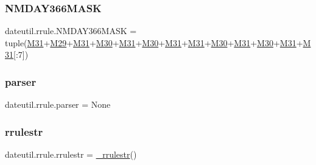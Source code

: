 \subsubsection{\texorpdfstring{N\+M\+D\+A\+Y366\+M\+A\+SK}{NMDAY366MASK}}
{\footnotesize\ttfamily dateutil.\+rrule.\+N\+M\+D\+A\+Y366\+M\+A\+SK = tuple(\hyperlink{namespacedateutil_1_1rrule_aff88a8ca05b8ccefded35b249ead0c6e}{M31}+\hyperlink{namespacedateutil_1_1rrule_aa48d0a3018e00f60591bac3321202fc6}{M29}+\hyperlink{namespacedateutil_1_1rrule_aff88a8ca05b8ccefded35b249ead0c6e}{M31}+\hyperlink{namespacedateutil_1_1rrule_a21e1626326f7f257e5d2e4a7195af9ba}{M30}+\hyperlink{namespacedateutil_1_1rrule_aff88a8ca05b8ccefded35b249ead0c6e}{M31}+\hyperlink{namespacedateutil_1_1rrule_a21e1626326f7f257e5d2e4a7195af9ba}{M30}+\hyperlink{namespacedateutil_1_1rrule_aff88a8ca05b8ccefded35b249ead0c6e}{M31}+\hyperlink{namespacedateutil_1_1rrule_aff88a8ca05b8ccefded35b249ead0c6e}{M31}+\hyperlink{namespacedateutil_1_1rrule_a21e1626326f7f257e5d2e4a7195af9ba}{M30}+\hyperlink{namespacedateutil_1_1rrule_aff88a8ca05b8ccefded35b249ead0c6e}{M31}+\hyperlink{namespacedateutil_1_1rrule_a21e1626326f7f257e5d2e4a7195af9ba}{M30}+\hyperlink{namespacedateutil_1_1rrule_aff88a8ca05b8ccefded35b249ead0c6e}{M31}+\hyperlink{namespacedateutil_1_1rrule_aff88a8ca05b8ccefded35b249ead0c6e}{M31}\mbox{[}\+:7\mbox{]})}

\mbox{\label{namespacedateutil_1_1rrule_a6fad102cafe956f4cf9b3e17c0ff78bb}} 
\subsubsection{\texorpdfstring{parser}{parser}}
{\footnotesize\ttfamily dateutil.\+rrule.\+parser = None}

\mbox{\label{namespacedateutil_1_1rrule_a833e9e6e7b3e4c65b3e740eef460d9f5}} 
\subsubsection{\texorpdfstring{rrulestr}{rrulestr}}
{\footnotesize\ttfamily dateutil.\+rrule.\+rrulestr = \hyperlink{classdateutil_1_1rrule_1_1__rrulestr}{\+\_\+rrulestr}()}

